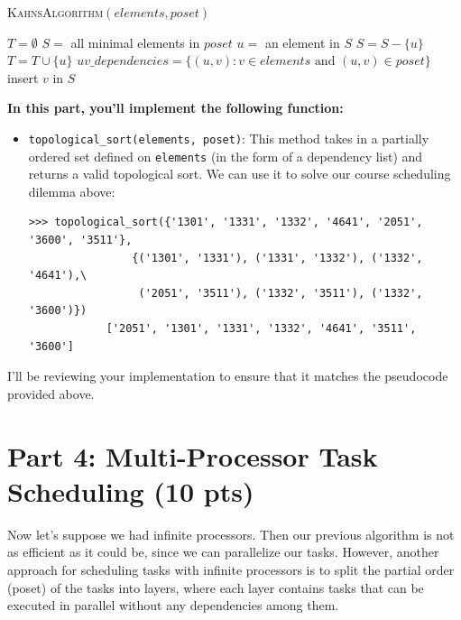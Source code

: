 \documentclass{article}
\begin{document}
    \begin{algorithm}
        \caption{\textsc{KahnsAlgorithm}$(elements, poset)$}\label{alg:cap}
        \label{alg:topological_sort}
        \begin{algorithmic}
            \State $T = \emptyset$
            \State $S = $ all minimal elements in $poset$
                \State $u = $ an element in $S$
                \State $S = S - \{u\}$
                \State $T = T \cup \{u\}$
                \State $uv\_dependencies = \{(u, v) : v \in elements \text{ and }(u, v) \in poset\}$
                     insert $v$ in $S$ \EndIf
                \EndFor
            \EndWhile
            \State {}
        \end{algorithmic}
    \end{algorithm}
    
    \begin{tcolorbox}[colback=yellow!30]
        \textbf{In this part, you'll implement the following function:}
        \begin{itemize}
            \item 
        \lstinline{topological_sort(elements, poset)}: This method takes in a partially ordered set defined on \lstinline{elements} (in the form of a dependency list) and returns a valid topological sort. We can use it to solve our course scheduling dilemma above:

    \begin{lstlisting}[belowskip=-10pt]
        >>> topological_sort({'1301', '1331', '1332', '4641', '2051', '3600', '3511'},
                {('1301', '1331'), ('1331', '1332'), ('1332', '4641'),\
                 ('2051', '3511'), ('1332', '3511'), ('1332', '3600')})
            ['2051', '1301', '1331', '1332', '4641', '3511', '3600']
    \end{lstlisting}
        \end{itemize}
    I'll be reviewing your implementation to ensure that it matches the pseudocode provided above.
    \end{tcolorbox}

\section*{Part 4: Multi-Processor Task Scheduling (10 pts)}
    Now let's suppose we had infinite processors. Then our previous algorithm is not as efficient as it could be, since we can parallelize our tasks. However, another approach for scheduling tasks with infinite processors is to split the partial order (poset) of the tasks into layers, where each layer contains tasks that can be executed in parallel without any dependencies among them.
\end{document}
